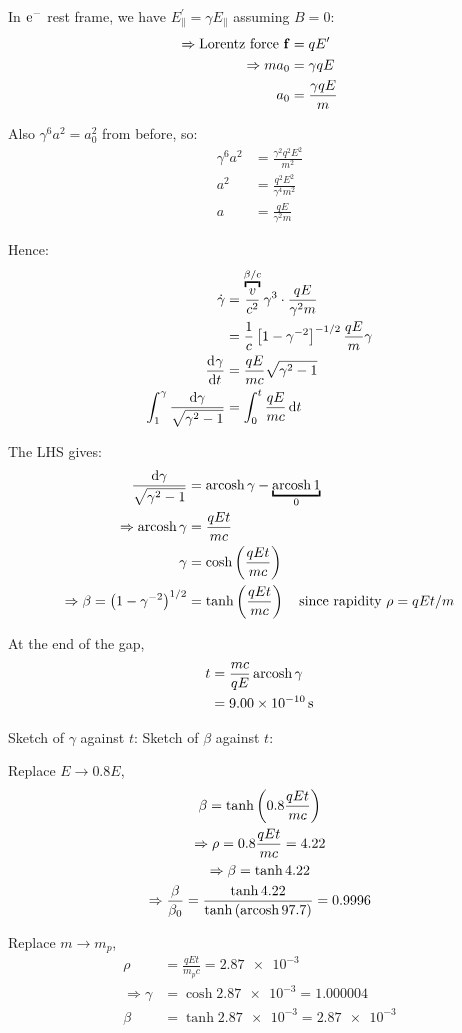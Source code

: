 \begin{parts}
	In $\mathrm{e}^{-}$ rest frame, we have $E_\parallel^\prime = \gamma E_\parallel$ assuming $B=0$:
	\begin{align*}
		\Rightarrow \textnormal{Lorentz force } \mathbf{f} &= qE^\prime \\
		\Rightarrow ma_0 &= \gamma qE \\
		a_0 &= \frac{\gamma qE}{m}
	\end{align*}
	
	Also $\gamma^6 a^2 = a_0^2$ from before, so:
	\begin{align*}
		\gamma^6 a^2 &= \frac{\gamma^2 q^2 E^2}{m^2} \\
		a^2 &= \frac{q^2 E^2}{\gamma^4 m^2} \\
		a &= \frac{qE}{\gamma^2 m}
	\end{align*}
	
	Hence:
	\begin{align*}
		\dot{\gamma} &= \overbracket{\frac{v}{c^2}}^{\beta/c} \gamma^3 \cdot \frac{qE}{\gamma^2 m} \\
		&= \frac{1}{c} \sbracket{1-\gamma^{-2}}^{-1/2} \frac{qE}{m} \gamma \\
		\deri{\gamma}{t} &= \frac{qE}{mc} \sqrt{\gamma^2 - 1} \\
		\int_{1}^{\gamma} \frac{\mathrm{d}\gamma}{\sqrt{\gamma^2 - 1}} &= \defint{0}{t}{\frac{qE}{mc}}{t}
	\end{align*}
	
	The LHS gives:
	\begin{align*}
		\frac{\mathrm{d}\gamma}{\sqrt{\gamma^2 - 1}} &= \arcosh\gamma - \underbracket{\arcosh 1}_{0} \\
		\Rightarrow \arcosh\gamma &= \frac{qEt}{mc} \\
		\gamma &= \cosh\rbracket{\frac{qEt}{mc}} \\
		\Rightarrow \beta = \rbracket{1 - \gamma^{-2}}^{1/2} &= \tanh\rbracket{\frac{qEt}{mc}}
		\mtext{since rapidity $\rho=qEt/m$}
	\end{align*}
	
	At the end of the gap,
	\begin{align*}
		t &= \frac{mc}{qE} \operatorname{arcosh}\gamma \\
		&= \SI{9.00e-10}{\second}
	\end{align*}
	
	Sketch of $\gamma$ against $t$:
	\newpage
	Sketch of $\beta$ against $t$:
	
	Replace $E \to 0.8E$,
	\begin{gather*}
		\beta = \tanh\left(0.8 \frac{qEt}{mc}\right) \\
		\Rightarrow \rho = 0.8 \frac{qEt}{mc} = 4.22 \\
		\Rightarrow \beta = \tanh 4.22 \\
		\Rightarrow \frac{\beta}{\beta_0} = \frac{\tanh 4.22}{\tanh\left(\operatorname{arcosh} 97.7\right)} = \num{0.9996}
	\end{gather*}
	
	Replace $m \to m_p$,
	\begin{align*}
		\rho &= \frac{qEt}{m_p c} = \num{2.87e-3} \\
		\Rightarrow \gamma &= \cosh\num{2.87e-3} = \num{1.000004} \\
		\beta &= \tanh\num{2.87e-3} = \num{2.87e-3}
	\end{align*}
\end{parts}